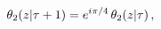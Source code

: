 \[\mathop{\theta_{2}\/}\nolimits\!\left(z\middle|\tau+1\right)=e^{i\pi/4}\mathop%
{\theta_{2}\/}\nolimits\!\left(z\middle|\tau\right),\]